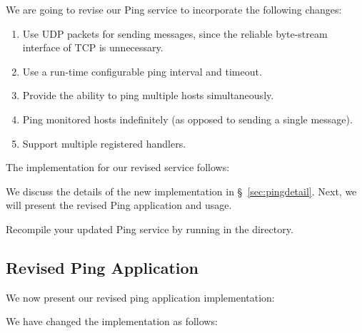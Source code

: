 We are going to revise our Ping service to incorporate the following
changes:

\begin{enumerate}

\item Use UDP packets for sending messages, since the reliable
  byte-stream interface of TCP is unnecessary.

\item Use a run-time configurable ping interval and timeout.

\item Provide the ability to ping multiple hosts simultaneously.

\item Ping monitored hosts indefinitely (as opposed to sending a
  single message).

\item Support multiple registered handlers.

\end{enumerate}

The implementation for our revised service
 follows:


We discuss the details of the new implementation in
\S~\ref{sec:pingdetail}.  Next, we will present the revised Ping
application and usage.

Recompile your updated Ping service by running  in the
 directory.

\subsection{Revised Ping Application}
\label{sec:ping-application}

We now present our revised ping application  implementation:


We have changed the implementation as follows:

